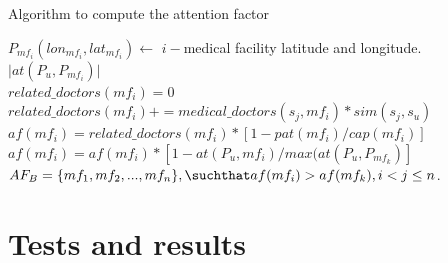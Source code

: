 \documentclass[sustainability,article,submit,pdftex,moreauthors]{Definitions/mdpi}
\begin{document}
\begin{algorithm}
\caption{Algorithm to compute the attention factor}
\label{algorithm_attention_factor}

 {
    $P_{mf_{i}}(lon_{mf_i}, lat_{mf_i}) \gets$  $i-$medical facility latitude and longitude. \\
    $\lvert{at(P_{u}, P_{mf_{i}})}\rvert$ \\
    $related\_doctors(mf_{i})=0$ \\
     {
        $related\_doctors(mf_{i}) += medical\_doctors(s_j, mf_{i}) *  sim(s_j, s_u)$ \\     
	}
    $af(mf_{i}) = related\_doctors(mf_{i})*[1 - pat(mf_{i}) / cap(mf_{i})]$ \\
    $af(mf_{i}) = af(mf_{i}) * [1 - at(P_u, mf_{i}) / max(at(P_u, P_{mf_k})]$
}
$AF_{B} = \{ mf_{1}, mf_{2}, ..., mf_{n} \}, \suchthat  af(mf_{i}) > af(mf_{k}), i<j \leq n$. \\
\BlankLine
\end{algorithm}

\section{Tests and results}

\end{document}
